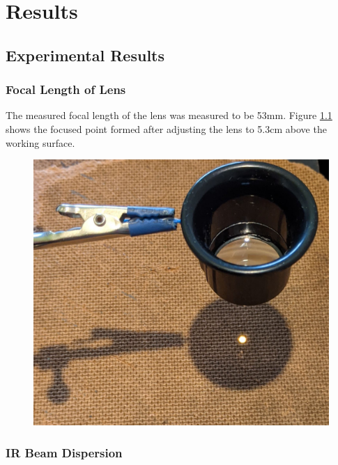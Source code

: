\chapter{Results}
\label{ch_results}



\section{Experimental Results}

\subsection{Focal Length of Lens}

The measured focal length of the lens was measured to be 53mm. Figure \ref{fig:focal_length_experiemnt_result} shows the focused point formed after adjusting the lens to 5.3cm above the working surface.

\begin{figure}[H]
	\centering
	\includegraphics[width=.6\linewidth]{figures/results/focal_length_result.jpg}
	\label{fig:focal_length_experiemnt_result}
\end{figure}


\subsection{IR Beam Dispersion}

